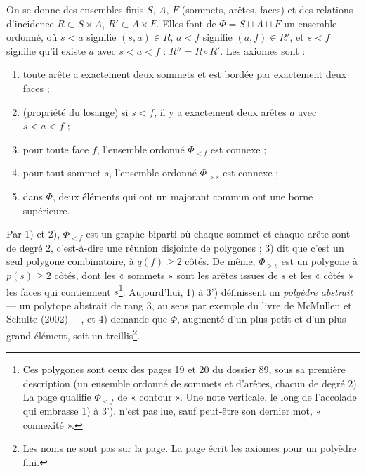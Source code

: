 \documentclass[11pt,a4paper]{article}
\begin{document}
On se donne des ensembles finis $S$, $A$, $F$ (sommets, arêtes, faces) et des
relations d'incidence $R \subset S \times A$, $R' \subset A \times F$. Elles
font de $\Phi = S \sqcup A \sqcup F$ un ensemble ordonné, où $s < a$ signifie
$(s, a) \in R$, $a < f$ signifie $(a, f) \in R'$, et $s < f$ signifie qu'il
existe $a$ avec $s < a < f$ : $R'' = R \circ R'$. Les axiomes sont :
\begin{enumerate}
  \item[1)] toute arête a exactement deux sommets et est bordée par exactement
    deux faces ;
  \item[2)] (propriété du losange) si $s < f$, il y a exactement deux arêtes
    $a$ avec $s < a < f$ ;
  \item[3)] pour toute face $f$, l'ensemble ordonné $\Phi_{<f}$ est connexe ;
  \item[3')] pour tout sommet $s$, l'ensemble ordonné $\Phi_{>s}$ est connexe ;
  \item[4)] dans $\Phi$, deux éléments qui ont un majorant commun ont une borne
    supérieure.
\end{enumerate}
Par 1) et 2), $\Phi_{<f}$ est un graphe biparti où chaque sommet et chaque arête
sont de degré $2$, c'est-à-dire une réunion disjointe de polygones ; 3) dit
que c'est un seul polygone combinatoire, à $q(f) \geq 2$ côtés. De même,
$\Phi_{>s}$ est un polygone à $p(s) \geq 2$ côtés, dont les « sommets » sont
les arêtes issues de $s$ et les « côtés » les faces qui contiennent
$s$\footnote{Ces polygones sont ceux des pages 19 et 20 du dossier 89, sous
sa première description (un ensemble ordonné de sommets et d'arêtes, chacun
de degré $2$). La page qualifie $\Phi_{<f}$ de « contour ». Une note verticale,
le long de l'accolade qui embrasse 1) à 3'), n'est pas lue, sauf peut-être son
dernier mot, « connexité ».}. Aujourd'hui, 1) à 3') définissent un
\emph{polyèdre abstrait} --- un polytope abstrait de rang $3$, au sens par
exemple du livre de McMullen et Schulte (2002) ---, et 4) demande que
$\Phi$, augmenté d'un plus petit et d'un plus grand élément, soit un
treillis\footnote{Les noms ne sont pas sur la page. La page écrit les axiomes
pour un polyèdre fini.}.
\end{document}
